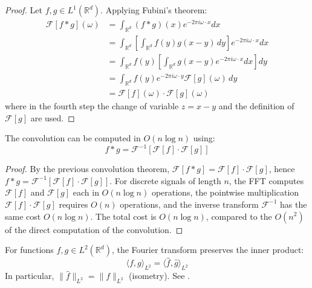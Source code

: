 \begin{proof}
Let $f, g \in L^1(\mathbb{R}^d)$. Applying Fubini's theorem:
\begin{align}
\mathcal{F}[f * g](\omega) &= \int_{\mathbb{R}^d} (f * g)(x) e^{-2\pi i\omega \cdot x} dx \\
&= \int_{\mathbb{R}^d} \left[\int_{\mathbb{R}^d} f(y)g(x-y) \, dy\right] e^{-2\pi i\omega \cdot x} dx \\
&= \int_{\mathbb{R}^d} f(y) \left[\int_{\mathbb{R}^d} g(x-y) e^{-2\pi i\omega \cdot x} dx\right] dy \\
&= \int_{\mathbb{R}^d} f(y) e^{-2\pi i\omega \cdot y} \mathcal{F}[g](\omega) \, dy \\
&= \mathcal{F}[f](\omega) \cdot \mathcal{F}[g](\omega)
\end{align}
where in the fourth step the change of variable $z = x - y$ and the definition of $\mathcal{F}[g]$ are used.
\end{proof}

\begin{corollary}
The convolution can be computed in \(O(n \log n)\) using:
\[
f * g = \mathcal{F}^{-1}[\mathcal{F}[f] \cdot \mathcal{F}[g]]
\]
\end{corollary}

\begin{proof}
By the previous convolution theorem, $\mathcal{F}[f * g] = \mathcal{F}[f] \cdot \mathcal{F}[g]$, hence $f * g = \mathcal{F}^{-1}[\mathcal{F}[f] \cdot \mathcal{F}[g]]$. For discrete signals of length $n$, the \gls{FFT} computes $\mathcal{F}[f]$ and $\mathcal{F}[g]$ each in $O(n \log n)$ operations, the pointwise multiplication $\mathcal{F}[f] \cdot \mathcal{F}[g]$ requires $O(n)$ operations, and the inverse transform $\mathcal{F}^{-1}$ has the same cost $O(n \log n)$. The total cost is $O(n \log n)$, compared to the $O(n^2)$ of the direct computation of the convolution.
\end{proof}

\begin{theorem}\label{thm:plancherel}
For functions $f, g \in L^2(\mathbb{R}^d)$, the Fourier transform preserves the inner product:
\begin{equation}
\langle f, g \rangle_{L^2} = \langle \hat{f}, \hat{g} \rangle_{L^2}
\end{equation}
In particular, $\|\hat{f}\|_{L^2} = \|f\|_{L^2}$ (isometry). See \citep[Theorem~8.29]{Folland1999}.
\end{theorem}

